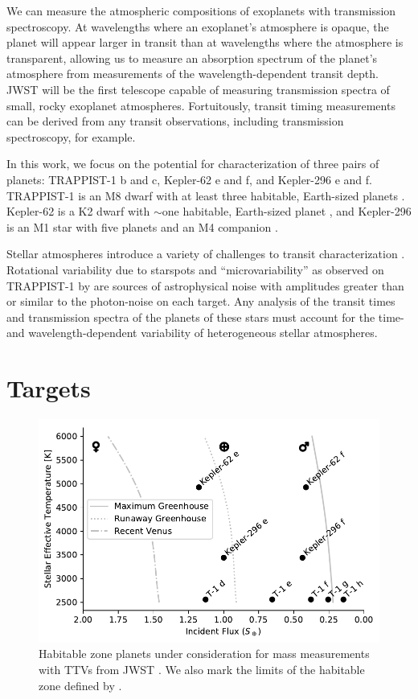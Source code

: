 We can measure the atmospheric compositions of exoplanets with transmission spectroscopy. At wavelengths where an exoplanet's atmosphere is opaque, the planet will appear larger in transit than at wavelengths where the atmosphere is transparent, allowing us to measure an absorption spectrum of the planet's atmosphere from measurements of the wavelength-dependent transit depth. JWST will be the first telescope capable of measuring transmission spectra of small, rocky exoplanet atmospheres. Fortuitously, transit timing measurements can be derived from any transit observations, including transmission spectroscopy, for example.

In this work, we focus on the potential for characterization of three pairs of planets: TRAPPIST-1 b and c, Kepler-62 e and f, and Kepler-296 e and f. TRAPPIST-1 is an M8 dwarf with at least three habitable, Earth-sized planets \citep{Gillon2016, Gillon2017, Delrez2018}. Kepler-62 is a K2 dwarf with $\sim$one habitable, Earth-sized planet \citep{Borucki2013}, and Kepler-296 is an M1 star with five planets and an M4 companion \citep{Barclay2015}.

Stellar atmospheres introduce a variety of challenges to transit characterization \citep{Rackham2018, Zhang2018}. Rotational variability due to starspots and  ``microvariability''  as observed on TRAPPIST-1 by \citet{Delrez2018} are sources of astrophysical noise with amplitudes greater than or similar to the photon-noise on each target. Any analysis of the transit times and transmission spectra of the planets of these stars must account for the time- and wavelength-dependent variability of heterogeneous stellar atmospheres.

\section{Targets}

\begin{figure}
\centering
\includegraphics[scale=0.58]{libra/census.pdf}
\caption{Habitable zone planets under consideration for mass measurements with TTVs from JWST \citep{Borucki2013, Delrez2018}. We also mark the limits of the habitable zone defined by \citet{Kopparapu2013}.}
\label{fig:census}
\end{figure}


